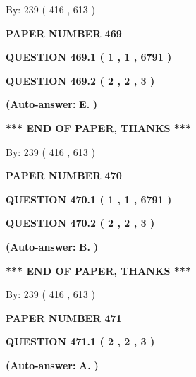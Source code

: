 \documentclass[12pt]{article}
\begin{document}
   
\hspace{1.0in} By: 
 239 ( 416 ,  613 )
   
   
   
   
\newpage 
\setcounter{page}{ 
   469001 } 
   
   
 {\textbf{ \Large{ PAPER NUMBER  469  }}}
   
   
   
   
  
  
{\textbf{\large{QUESTION
469.1 
 ( 1 , 1 , 6791 )
}}}
  
  
{\textbf{\large{QUESTION
469.2 
 ( 2 , 2 , 3 )
}}}
 
 
{\textbf{(Auto-answer:}}
{\textbf{\large{
E.}}}
{\textbf{)}}
 
 
   
   
   
   
\vspace{1.0in} 
{\textbf{\large{ *** END OF PAPER, THANKS *** }}} 
   
   
\hspace{1.0in} By: 
 239 ( 416 ,  613 )
   
   
   
   
\newpage 
\setcounter{page}{ 
   470001 } 
   
   
 {\textbf{ \Large{ PAPER NUMBER  470  }}}
   
   
   
   
  
  
{\textbf{\large{QUESTION
470.1 
 ( 1 , 1 , 6791 )
}}}
  
  
{\textbf{\large{QUESTION
470.2 
 ( 2 , 2 , 3 )
}}}
 
 
{\textbf{(Auto-answer:}}
{\textbf{\large{
B.}}}
{\textbf{)}}
 
 
   
   
   
   
\vspace{1.0in} 
{\textbf{\large{ *** END OF PAPER, THANKS *** }}} 
   
   
\hspace{1.0in} By: 
 239 ( 416 ,  613 )
   
   
   
   
\newpage 
\setcounter{page}{ 
   471001 } 
   
   
 {\textbf{ \Large{ PAPER NUMBER  471  }}}
   
   
   
   
  
  
{\textbf{\large{QUESTION
471.1 
 ( 2 , 2 , 3 )
}}}
 
 
{\textbf{(Auto-answer:}}
{\textbf{\large{
A.}}}
{\textbf{)}}
 
\end{document}
